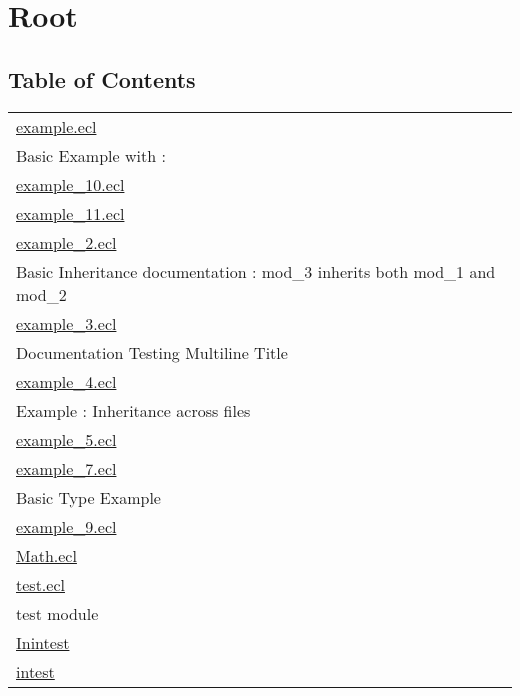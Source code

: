 \chapter*{Root}
\hypertarget{ecldoc:toc:root}{}


\section*{Table of Contents}
{\renewcommand{\arraystretch}{1.5}
\begin{longtable}{|p{\textwidth}|}
\hline
\hyperlink{ecldoc:toc:example}{example.ecl} \\
Basic Example with : \\
\hline
\hyperlink{ecldoc:toc:example_10}{example\_10.ecl} \\
\hline
\hyperlink{ecldoc:toc:example_11}{example\_11.ecl} \\
\hline
\hyperlink{ecldoc:toc:example_2}{example\_2.ecl} \\
Basic Inheritance documentation : mod\_3 inherits both mod\_1 and mod\_2 \\
\hline
\hyperlink{ecldoc:toc:example_3}{example\_3.ecl} \\
Documentation Testing Multiline Title \\
\hline
\hyperlink{ecldoc:toc:example_4}{example\_4.ecl} \\
Example : Inheritance across files \\
\hline
\hyperlink{ecldoc:toc:example_5}{example\_5.ecl} \\
\hline
\hyperlink{ecldoc:toc:example_7}{example\_7.ecl} \\
Basic Type Example \\
\hline
\hyperlink{ecldoc:toc:example_9}{example\_9.ecl} \\
\hline
\hyperlink{ecldoc:toc:Math}{Math.ecl} \\
\hline
\hyperlink{ecldoc:toc:test}{test.ecl} \\
test module \\
\hline
\hyperlink{ecldoc:toc:Inintest}{Inintest} \\
\hline
\hyperlink{ecldoc:toc:intest}{intest} \\
\hline
\end{longtable}
}















